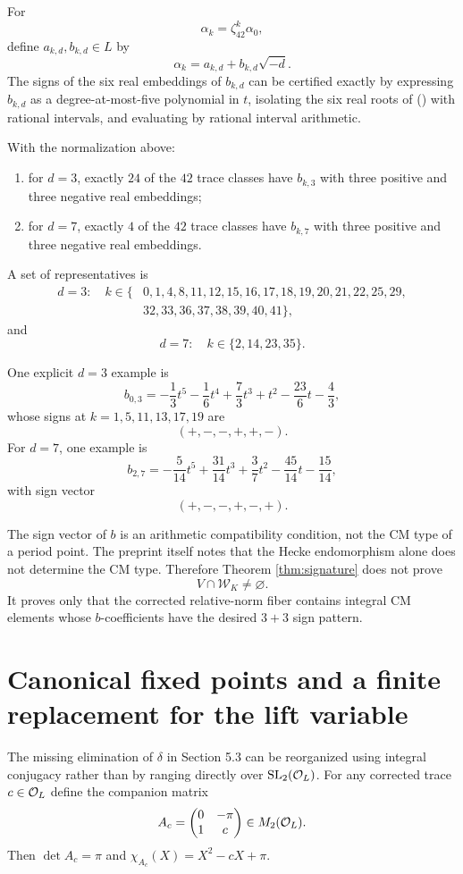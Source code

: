 For
\[
 \alpha_k=\zeta_{42}^k\alpha_0,
\]
define $a_{k,d},b_{k,d}\in L$ by
\[
 \alpha_k=a_{k,d}+b_{k,d}\sqrt{-d}.
\]
The signs of the six real embeddings of $b_{k,d}$ can be certified exactly by expressing $b_{k,d}$ as a degree-at-most-five polynomial in $t$, isolating the six real roots of () with rational intervals, and evaluating by rational interval arithmetic.

\begin{theorem}\label{thm:signature}
With the normalization above:
\begin{enumerate}[label=(\alph*)]
\item for $d=3$, exactly $24$ of the $42$ trace classes have $b_{k,3}$ with three positive and three negative real embeddings;
\item for $d=7$, exactly $4$ of the $42$ trace classes have $b_{k,7}$ with three positive and three negative real embeddings.
\end{enumerate}
A set of representatives is
\[
\begin{split}
 d=3:\quad k\in\{&0,1,4,8,11,12,15,16,17,18,19,20,21,22,25,29,\\
 &32,33,36,37,38,39,40,41\},
\end{split}
\]
and
\[
 d=7:\quad k\in\{2,14,23,35\}.
\]
\end{theorem}

One explicit $d=3$ example is
\[
 b_{0,3}=-\frac13t^5-\frac16t^4+\frac73t^3+t^2-\frac{23}{6}t-\frac43,
\]
whose signs at $k=1,5,11,13,17,19$ are
\[
 (+,-,-,+,+,-).
\]
For $d=7$, one example is
\[
 b_{2,7}=-\frac5{14}t^5+\frac{31}{14}t^3+\frac37t^2-\frac{45}{14}t-\frac{15}{14},
\]
with sign vector
\[
 (+,-,-,+,-,+).
\]

\begin{remark}\label{rem:notgeometry}
The sign vector of $b$ is an arithmetic compatibility condition, not the CM type of a period point. The preprint itself notes that the Hecke endomorphism alone does not determine the CM type. Therefore Theorem \ref{thm:signature} does not prove
\[
 V\cap\mathcal W_K\ne\varnothing.
\]
It proves only that the corrected relative-norm fiber contains integral CM elements whose $b$-coefficients have the desired $3+3$ sign pattern.
\end{remark}


\section{Canonical fixed points and a finite replacement for the lift variable}
The missing elimination of $\delta$ in Section 5.3 can be reorganized using integral conjugacy rather than by ranging directly over $\mathrm{SL}_2(\mathcal O_L)$. For any corrected trace $c\in\mathcal O_L$ define the companion matrix
\begin{equation}\label{eq:companion}
 A_c=\begin{pmatrix}0&-\pi\\1&c\end{pmatrix}\in M_2(\mathcal O_L).
\end{equation}
Then $\det A_c=\pi$ and $\chi_{A_c}(X)=X^2-cX+\pi$.

